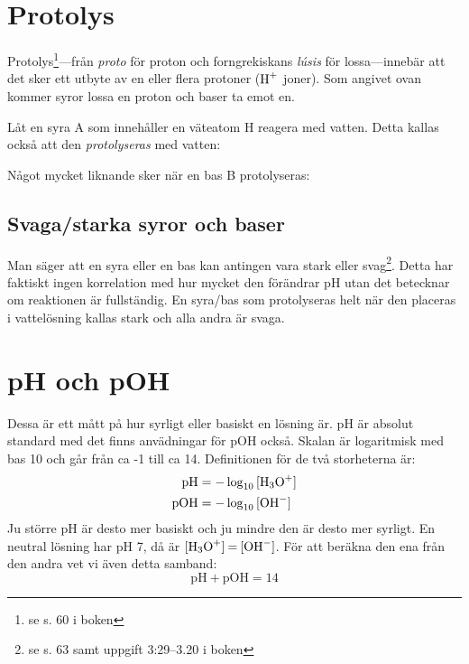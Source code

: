 \section{Protolys}

Protolys\footnote{se s. 60 i boken}---från \emph{proto} för proton och forngrekiskans \emph{lúsis} för lossa---innebär att det sker ett utbyte av en eller flera protoner ($\ce{H+}$ joner). Som angivet ovan kommer syror lossa en proton och baser ta emot en.
\begin{exm}
    Låt en syra A som innehåller en väteatom H reagera med vatten. Detta kallas också att den \emph{protolyseras} med vatten:
    \begin{center}
    \end{center}
    Något mycket liknande sker när en bas B protolyseras:
    \begin{center}
    \end{center}
\end{exm}

\subsection{Svaga/starka syror och baser}
Man säger att en syra eller en bas kan antingen vara stark eller svag\footnote{se s. 63 samt uppgift 3:29--3.20 i boken}. Detta har faktiskt ingen korrelation med hur mycket den förändrar pH utan det betecknar om reaktionen är fullständig. En syra/bas som protolyseras helt när den placeras i vattelösning kallas stark och alla andra är svaga.

\section{pH och pOH}
Dessa är ett mått på hur syrligt eller basiskt en lösning är. pH är absolut standard med det finns anvädningar för pOH också. Skalan är logaritmisk med bas 10 och går från ca -1 till ca 14. Definitionen för de två storheterna är:
\begin{align*}
    \mathrm{pH} &= -\log_{10}{\ce{[H3O+]}} \\
    \mathrm{pOH} &= -\log_{10}{\ce{[OH^-]}}
\end{align*}
Ju större pH är desto mer basiskt och ju mindre den är desto mer syrligt. En neutral lösning har pH 7, då är $\ce{[H3O+] = [OH^-]}$. För att beräkna den ena från den andra vet vi även detta samband:
\[
    \mathrm{pH + pOH} = 14
\]


